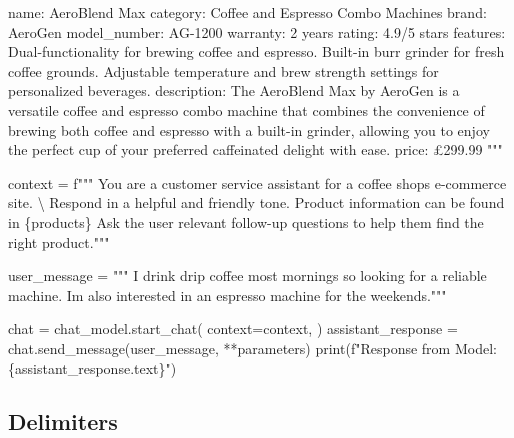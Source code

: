 \documentclass[
  letterpaper,
  DIV=11,
  numbers=noendperiod]{scrreprt}
\newenvironment{Shaded}{\begin{snugshade}}{\end{snugshade}}
\newcommand{\BuiltInTok}[1]{\textcolor[rgb]{0.00,0.23,0.31}{#1}}
\newcommand{\CharTok}[1]{\textcolor[rgb]{0.13,0.47,0.30}{#1}}
\newcommand{\NormalTok}[1]{\textcolor[rgb]{0.00,0.23,0.31}{#1}}
\newcommand{\OperatorTok}[1]{\textcolor[rgb]{0.37,0.37,0.37}{#1}}
\newcommand{\SpecialCharTok}[1]{\textcolor[rgb]{0.37,0.37,0.37}{#1}}
\newcommand{\SpecialStringTok}[1]{\textcolor[rgb]{0.13,0.47,0.30}{#1}}
\newcommand{\StringTok}[1]{\textcolor[rgb]{0.13,0.47,0.30}{#1}}
\begin{document}
\begin{Shaded}
\begin{Highlighting}[]
\StringTok{name: AeroBlend Max}
\StringTok{category: Coffee and Espresso Combo Machines}
\StringTok{brand: AeroGen}
\StringTok{model\_number: AG{-}1200}
\StringTok{warranty: 2 years}
\StringTok{rating: 4.9/5 stars}
\StringTok{features:}
\StringTok{  Dual{-}functionality for brewing coffee and espresso.}
\StringTok{  Built{-}in burr grinder for fresh coffee grounds.}
\StringTok{  Adjustable temperature and brew strength settings for personalized beverages.}
\StringTok{description: The AeroBlend Max by AeroGen is a versatile coffee and espresso combo machine that combines the convenience of brewing both coffee and espresso with a built{-}in grinder,}
\StringTok{allowing you to enjoy the perfect cup of your preferred caffeinated delight with ease.}
\StringTok{price: £299.99}
\StringTok{"""}
\end{Highlighting}
\end{Shaded}

\begin{Shaded}
\begin{Highlighting}[]
\NormalTok{context }\OperatorTok{=} \SpecialStringTok{f"""}
\SpecialStringTok{You are a customer service assistant for a coffee shop\textquotesingle{}s e{-}commerce site. }\CharTok{\textbackslash{}}
\SpecialStringTok{Respond in a helpful and friendly tone.}
\SpecialStringTok{Product information can be found in }\SpecialCharTok{\{}\NormalTok{products}\SpecialCharTok{\}}
\SpecialStringTok{Ask the user relevant follow{-}up questions to help them find the right product."""}

\NormalTok{user\_message }\OperatorTok{=} \StringTok{"""}
\StringTok{I drink drip coffee most mornings so looking for a reliable machine.}
\StringTok{I\textquotesingle{}m also interested in an espresso machine for the weekends."""}

\NormalTok{chat }\OperatorTok{=}\NormalTok{ chat\_model.start\_chat(}
\NormalTok{    context}\OperatorTok{=}\NormalTok{context,}
\NormalTok{)}
\NormalTok{assistant\_response }\OperatorTok{=}\NormalTok{ chat.send\_message(user\_message, }\OperatorTok{**}\NormalTok{parameters)}
\BuiltInTok{print}\NormalTok{(}\SpecialStringTok{f"Response from Model: }\SpecialCharTok{\{}\NormalTok{assistant\_response}\SpecialCharTok{.}\NormalTok{text}\SpecialCharTok{\}}\SpecialStringTok{"}\NormalTok{)}
\end{Highlighting}
\end{Shaded}

\hypertarget{delimiters}{%
\subsection{Delimiters}\label{delimiters}}
\end{document}
